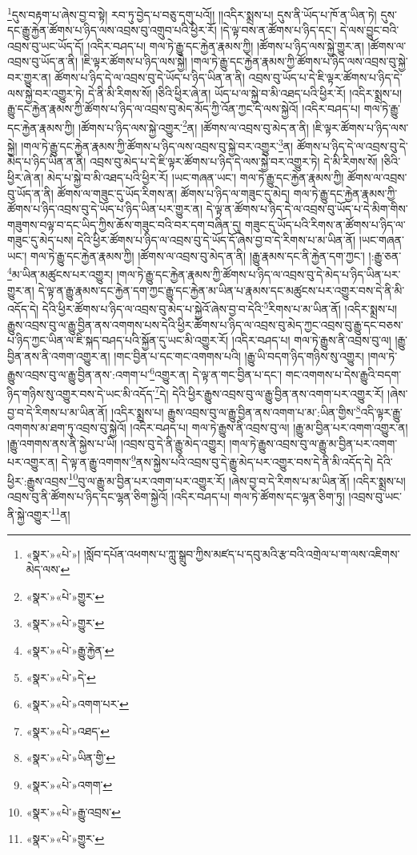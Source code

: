 \footnote{«སྣར་»«པེ་»། །སློབ་དཔོན་འཕགས་པ་ཀླུ་སྒྲུབ་ཀྱིས་མཛད་པ་དབུ་མའི་རྩ་བའི་འགྲེལ་པ་ག་ལས་འཇིགས་མེད་ལས་}དུས་བརྟག་པ་ཞེས་བྱ་བ་སྟེ། རབ་ཏུ་བྱེད་པ་བཅུ་དགུ་པའོ།། །།འདིར་སྨྲས་པ། དུས་ནི་ཡོད་པ་ཁོ་ན་ཡིན་ཏེ། དུས་དང་རྒྱུ་རྐྱེན་ཚོགས་པ་ཉིད་ལས་འབྲས་བུ་འགྲུབ་པའི་ཕྱིར་རོ། །དེ་ལྟ་བས་ན་ཚོགས་པ་ཉིད་དང་། དེ་ལས་བྱུང་བའི་འབྲས་བུ་ཡང་ཡོད་དོ། །འདིར་བཤད་པ། གལ་ཏེ་རྒྱུ་དང་རྐྱེན་རྣམས་ཀྱི། །ཚོགས་པ་ཉིད་ལས་སྐྱེ་གྱུར་ན། །ཚོགས་ལ་འབྲས་བུ་ཡོད་ན་ནི། །ཇི་ལྟར་ཚོགས་པ་ཉིད་ལས་སྐྱེ། །གལ་ཏེ་རྒྱུ་དང་རྐྱེན་རྣམས་ཀྱི་ཚོགས་པ་ཉིད་ལས་འབྲས་བུ་སྐྱེ་བར་གྱུར་ན། ཚོགས་པ་ཉིད་དེ་ལ་འབྲས་བུ་དེ་ཡོད་པ་ཉིད་ཡིན་ན་ནི། འབྲས་བུ་ཡོད་པ་དེ་ཇི་ལྟར་ཚོགས་པ་ཉིད་དེ་ལས་སྐྱེ་བར་འགྱུར་ཏེ། དེ་ནི་མི་རིགས་སོ། །ཅིའི་ཕྱིར་ཞེ་ན། ཡོད་པ་ལ་སྐྱེ་བ་མི་འཐད་པའི་ཕྱིར་རོ། །འདིར་སྨྲས་པ། རྒྱུ་དང་རྐྱེན་རྣམས་ཀྱི་ཚོགས་པ་ཉིད་ལ་འབྲས་བུ་མེད་མོད་ཀྱི་འོན་ཀྱང་དེ་ལས་སྐྱེའོ། །འདིར་བཤད་པ། གལ་ཏེ་རྒྱུ་དང་རྐྱེན་རྣམས་ཀྱི། །ཚོགས་པ་ཉིད་ལས་སྐྱེ་འགྱུར་\footnote{«སྣར་»«པེ་»གྱུར་}ན། །ཚོགས་ལ་འབྲས་བུ་མེད་ན་ནི། །ཇི་ལྟར་ཚོགས་པ་ཉིད་ལས་སྐྱེ། །གལ་ཏེ་རྒྱུ་དང་རྐྱེན་རྣམས་ཀྱི་ཚོགས་པ་ཉིད་ལས་འབྲས་བུ་སྐྱེ་བར་འགྱུར་\footnote{«སྣར་»«པེ་»གྱུར་}ན། ཚོགས་པ་ཉིད་དེ་ལ་འབྲས་བུ་དེ་མེད་པ་ཉིད་ཡིན་ན་ནི། འབྲས་བུ་མེད་པ་དེ་ཇི་ལྟར་ཚོགས་པ་ཉིད་དེ་ལས་སྐྱེ་བར་འགྱུར་ཏེ། དེ་མི་རིགས་སོ། །ཅིའི་ཕྱིར་ཞེ་ན། མེད་པ་སྐྱེ་བ་མི་འཐད་པའི་ཕྱིར་རོ། །ཡང་གཞན་ཡང་། གལ་ཏེ་རྒྱུ་དང་རྐྱེན་རྣམས་ཀྱི། ཚོགས་ལ་འབྲས་བུ་ཡོད་ན་ནི། ཚོགས་ལ་གཟུང་དུ་ཡོད་རིགས་ན། ཚོགས་པ་ཉིད་ལ་གཟུང་དུ་མེད། གལ་ཏེ་རྒྱུ་དང་རྐྱེན་རྣམས་ཀྱི་ཚོགས་པ་ཉིད་འབྲས་བུ་དེ་ཡོད་པ་ཉིད་ཡིན་པར་གྱུར་ན། དེ་ལྟ་ན་ཚོགས་པ་ཉིད་དེ་ལ་འབྲས་བུ་ཡོད་པ་དེ་མིག་གིས་གཟུགས་བལྟ་བ་དང་ཡིད་ཀྱིས་ཆོས་གཟུང་བའི་བར་དག་བཞིན་དུ། གཟུང་དུ་ཡོད་པའི་རིགས་ན་ཚོགས་པ་ཉིད་ལ་གཟུང་དུ་མེད་པས། དེའི་ཕྱིར་ཚོགས་པ་ཉིད་ལ་འབྲས་བུ་དེ་ཡོད་དོ་ཞེས་བྱ་བ་དེ་རིགས་པ་མ་ཡིན་ནོ། །ཡང་གཞན་ཡང་། གལ་ཏེ་རྒྱུ་དང་རྐྱེན་རྣམས་ཀྱི། །ཚོགས་ལ་འབྲས་བུ་མེད་ན་ནི། །རྒྱུ་རྣམས་དང་ནི་རྐྱེན་དག་ཀྱང་། །:རྒྱུ་ཅན་\footnote{«སྣར་»«པེ་»རྒྱུ་རྐྱེན་}མ་ཡིན་མཚུངས་པར་འགྱུར། །གལ་ཏེ་རྒྱུ་དང་རྐྱེན་རྣམས་ཀྱི་ཚོགས་པ་ཉིད་ལ་འབྲས་བུ་དེ་མེད་པ་ཉིད་ཡིན་པར་གྱུར་ན། དེ་ལྟ་ན་རྒྱུ་རྣམས་དང་རྐྱེན་དག་ཀྱང་རྒྱུ་དང་རྐྱེན་མ་ཡིན་པ་རྣམས་དང་མཚུངས་པར་འགྱུར་བས་དེ་ནི་མི་འདོད་དེ། དེའི་ཕྱིར་ཚོགས་པ་ཉིད་ལ་འབྲས་བུ་མེད་པ་སྐྱེའོ་ཞེས་བྱ་བ་དེའི་\footnote{«སྣར་»«པེ་»དེ་}རིགས་པ་མ་ཡིན་ནོ། །འདིར་སྨྲས་པ། རྒྱུས་འབྲས་བུ་ལ་རྒྱུ་བྱིན་ནས་འགགས་པས་དེའི་ཕྱིར་ཚོགས་པ་ཉིད་ལ་འབྲས་བུ་མེད་ཀྱང་འབྲས་བུ་རྒྱུ་དང་བཅས་པ་ཉིད་ཀྱང་ཡིན་ལ་ཇི་སྐད་བཤད་པའི་སྐྱོན་དུ་ཡང་མི་འགྱུར་རོ། །འདིར་བཤད་པ། གལ་ཏེ་རྒྱུས་ནི་འབྲས་བུ་ལ། །རྒྱུ་བྱིན་ནས་ནི་འགག་འགྱུར་ན། །གང་བྱིན་པ་དང་གང་འགགས་པའི། །རྒྱུ་ཡི་བདག་ཉིད་གཉིས་སུ་འགྱུར། །གལ་ཏེ་རྒྱུས་འབྲས་བུ་ལ་རྒྱུ་བྱིན་ནས་:འགག་པ་\footnote{«སྣར་»«པེ་»འགག་པར་}འགྱུར་ན། དེ་ལྟ་ན་གང་བྱིན་པ་དང་། གང་འགགས་པ་དེས་རྒྱུའི་བདག་ཉིད་གཉིས་སུ་འགྱུར་བས་དེ་ཡང་མི་འདོད་\footnote{«སྣར་»«པེ་»འཐད་}དེ། དེའི་ཕྱིར་རྒྱུས་འབྲས་བུ་ལ་རྒྱུ་བྱིན་ནས་འགག་པར་འགྱུར་རོ། །ཞེས་བྱ་བ་དེ་རིགས་པ་མ་ཡིན་ནོ། །འདིར་སྨྲས་པ། རྒྱུས་འབྲས་བུ་ལ་རྒྱུ་བྱིན་ནས་འགག་པ་མ་:ཡིན་གྱིས་\footnote{«སྣར་»«པེ་»ཡིན་གྱི་}འདི་ལྟར་རྒྱུ་འགགས་མ་ཐག་ཏུ་འབྲས་བུ་སྐྱེའོ། །འདིར་བཤད་པ། གལ་ཏེ་རྒྱུས་ནི་འབྲས་བུ་ལ། །རྒྱུ་མ་བྱིན་པར་འགག་འགྱུར་ན། །རྒྱུ་འགགས་ནས་ནི་སྐྱེས་པ་ཡི། །འབྲས་བུ་དེ་ནི་རྒྱུ་མེད་འགྱུར། །གལ་ཏེ་རྒྱུས་འབྲས་བུ་ལ་རྒྱུ་མ་བྱིན་པར་འགག་པར་འགྱུར་ན། དེ་ལྟ་ན་རྒྱུ་འགགས་\footnote{«སྣར་»«པེ་»འགག་}ནས་སྐྱེས་པའི་འབྲས་བུ་དེ་རྒྱུ་མེད་པར་འགྱུར་བས་དེ་ནི་མི་འདོད་དེ། དེའི་ཕྱིར་:རྒྱུས་འབྲས་\footnote{«སྣར་»«པེ་»རྒྱུ་འབྲས་}བུ་ལ་རྒྱུ་མ་བྱིན་པར་འགག་པར་འགྱུར་རོ། །ཞེས་བྱ་བ་དེ་རིགས་པ་མ་ཡིན་ནོ། །འདིར་སྨྲས་པ། འབྲས་བུ་ནི་ཚོགས་པ་ཉིད་དང་ལྷན་ཅིག་སྐྱེའོ། །འདིར་བཤད་པ། གལ་ཏེ་ཚོགས་དང་ལྷན་ཅིག་ཏུ། །འབྲས་བུ་ཡང་ནི་སྐྱེ་འགྱུར་\footnote{«སྣར་»«པེ་»གྱུར་}ན། 